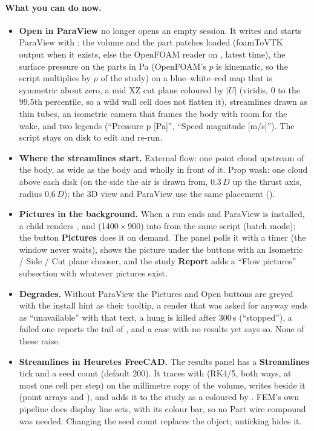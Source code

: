 \paragraph{What you can do now.}
\begin{itemize}[nosep]
  \item \textbf{Open in ParaView} no longer opens an empty session. It writes  and starts
        ParaView with : the volume and the part patches loaded (foamToVTK output when it exists, else the
        OpenFOAM reader on , latest time), the surface pressure on the parts in Pa (OpenFOAM's $p$ is
        kinematic, so the script multiplies by $\rho$ of the study) on a blue--white--red map that is symmetric about
        zero, a mid XZ cut plane coloured by $|U|$ (viridis, 0 to the 99.5th percentile, so a wild wall cell does not
        flatten it), streamlines drawn as thin tubes, an isometric camera that frames the body with room for the wake, and
        two legends (``Pressure p [Pa]'', ``Speed magnitude [m/s]''). The script stays on disk to edit and re-run.
  \item \textbf{Where the streamlines start.} External flow: one point cloud upstream of the body, as wide as the body and
        wholly in front of it. Prop wash: one cloud above each disk (on the side the air is drawn from, 0.3\,$D$ up the
        thrust axis, radius 0.6\,$D$); the 3D view and ParaView use the same placement ().
  \item \textbf{Pictures in the background.} When a run ends and ParaView is installed, a child  renders
        ,  and  (1400\,$\times$\,900) into 
        from the same script (batch mode); the button \textbf{Pictures} does it on demand. The panel polls it with a
        timer (the window never waits), shows the picture under the buttons with an Isometric / Side / Cut plane
        chooser, and the study \textbf{Report} adds a ``Flow pictures'' subsection with whatever pictures exist.
  \item \textbf{Degrades.} Without ParaView the Pictures and Open buttons are greyed with the install hint as their
        tooltip, a render that was asked for anyway ends as ``unavailable'' with that text, a hung  is
        killed after 300\,s (``stopped''), a failed one reports the tail of , and a case with no
        results yet says so. None of these raise.
  \item \textbf{Streamlines in Heuretes FreeCAD.} The results panel has a \textbf{Streamlines} tick and a seed count
        (default 200). It traces with  (RK4/5, both ways, at most one cell per step) on the
        millimetre copy of the volume, writes  beside it (point arrays  and ),
        and adds it to the study as a  coloured by . FEM's own pipeline does
        display line sets, with its colour bar, so no Part wire compound was needed. Changing the seed count replaces
        the object; unticking hides it.
\end{itemize}

